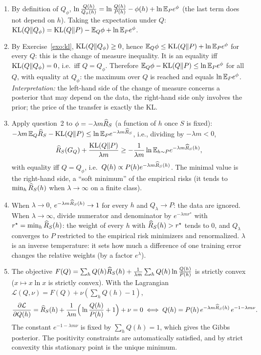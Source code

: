 \documentclass[11pt]{article}
\newcounter{exo}
\begin{document}
\begin{solution}
\begin{enumerate}
\item By definition of $Q_\phi$, $\ln\frac{Q(h)}{Q_\phi(h)}=\ln\frac{Q(h)}{P(h)}-\phi(h)+\ln\mathbb{E}_Pe^\phi$ (the last term does
      not depend on $h$). Taking the expectation under $Q$:
      $\operatorname{KL}(Q\|Q_\phi)=\operatorname{KL}(Q\|P)-\mathbb{E}_Q\phi+\ln\mathbb{E}_Pe^\phi$.
\item By Exercise~\ref{exo:kl}, $\operatorname{KL}(Q\|Q_\phi)\geq0$, hence $\mathbb{E}_Q\phi\leq\operatorname{KL}(Q\|P)+\ln\mathbb{E}_Pe^\phi$ for every $Q$: this is
      the change of measure inequality. It is an equality iff $\operatorname{KL}(Q\|Q_\phi)=0$, i.e.\ iff $Q=Q_\phi$. Therefore
      $\mathbb{E}_Q\phi-\operatorname{KL}(Q\|P)\leq\ln\mathbb{E}_Pe^\phi$ for all $Q$, with equality at $Q_\phi$: the maximum over $Q$ is reached
      and equals $\ln\mathbb{E}_Pe^\phi$. \emph{Interpretation:} the left-hand side of the change of measure concerns a
      posterior that may depend on the data, the right-hand side only involves the prior; the price of the
      transfer is exactly the KL.
\item Apply question~2 to $\phi=-\lambda m\widehat{R}_{S}$ (a function of $h$ once $S$ is fixed):
      $-\lambda m\,\mathbb{E}_Q\widehat{R}_{S}-\operatorname{KL}(Q\|P)\leq\ln\mathbb{E}_Pe^{-\lambda m\widehat{R}_{S}}$, i.e., dividing by $-\lambda m<0$,
      \[\widehat{R}_{S}(G_{Q})+\frac{\operatorname{KL}(Q\|P)}{\lambda m}\geq-\frac1{\lambda m}\ln\mathbb{E}_{h\sim P}e^{-\lambda m\widehat{R}_{S}(h)},\]
      with equality iff $Q=Q_\phi$, i.e.\ $Q(h)\propto P(h)e^{-\lambda m\widehat{R}_{S}(h)}$. The minimal value is the right-hand side,
      a ``soft minimum'' of the empirical risks (it tends to $\min_h\widehat{R}_{S}(h)$ when $\lambda\to\infty$ on a finite class).
\item When $\lambda\to0$, $e^{-\lambda m\widehat{R}_{S}(h)}\to1$ for every $h$ and $Q_\lambda\to P$: the data are ignored.
      When $\lambda\to\infty$, divide numerator and denominator by $e^{-\lambda m r^\star}$ with $r^\star=\min_h\widehat{R}_{S}(h)$:
      the weight of every $h$ with $\widehat{R}_{S}(h)>r^\star$ tends to $0$, and $Q_\lambda$ converges to $P$ restricted to the
      empirical risk minimizers and renormalized. $\lambda$ is an inverse temperature: it sets how much a
      difference of one training error changes the relative weights (by a factor $e^{\lambda}$).
\item The objective $F(Q)=\sum_hQ(h)\widehat{R}_{S}(h)+\frac1{\lambda m}\sum_hQ(h)\ln\frac{Q(h)}{P(h)}$ is strictly convex
      ($x\mapsto x\ln x$ is strictly convex). With the Lagrangian $\mathcal L(Q,\nu)=F(Q)+\nu(\sum_hQ(h)-1)$,
      \[\frac{\partial\mathcal L}{\partial Q(h)}=\widehat{R}_{S}(h)+\frac{1}{\lambda m}\Big(\ln\frac{Q(h)}{P(h)}+1\Big)+\nu=0
      \iff Q(h)=P(h)\,e^{-\lambda m\widehat{R}_{S}(h)}\,e^{-1-\lambda m\nu}.\]
      The constant $e^{-1-\lambda m\nu}$ is fixed by $\sum_hQ(h)=1$, which gives the Gibbs posterior. The positivity
      constraints are automatically satisfied, and by strict convexity this stationary point is the unique minimum.
\end{enumerate}
\end{solution}
\end{document}
